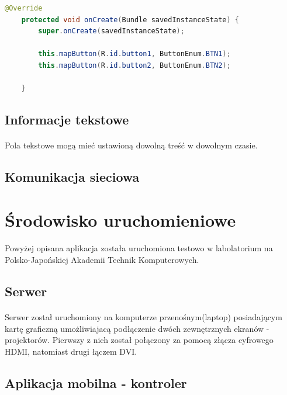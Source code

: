 \documentclass[12pt]{article}
\begin{document}
{{\begin{lstlisting}[language=Java]
 @Override
    protected void onCreate(Bundle savedInstanceState) {
        super.onCreate(savedInstanceState);

        this.mapButton(R.id.button1, ButtonEnum.BTN1);
        this.mapButton(R.id.button2, ButtonEnum.BTN2);

    }
\end{lstlisting}

\subsection{Informacje tekstowe}
\paragraph{}
Pola tekstowe mogą mieć ustawioną dowolną treść w dowolnym czasie.

\subsection{Komunikacja sieciowa}



\section{Środowisko uruchomieniowe}
\paragraph{}
Powyżej opisana aplikacja została uruchomiona testowo w labolatorium na Polsko-Japońskiej Akademii Technik Komputerowych.

\subsection{Serwer}
\paragraph{}
Serwer został uruchomiony na komputerze przenośnym(laptop) posiadającym kartę graficzną umożliwiajacą podłączenie dwóch zewnętrznych ekranów - projektorów. Pierwszy z nich został połączony za pomocą złącza cyfrowego HDMI, natomiast drugi łączem DVI.
\subsection{Aplikacja mobilna - kontroler}


}}
\end{document}
